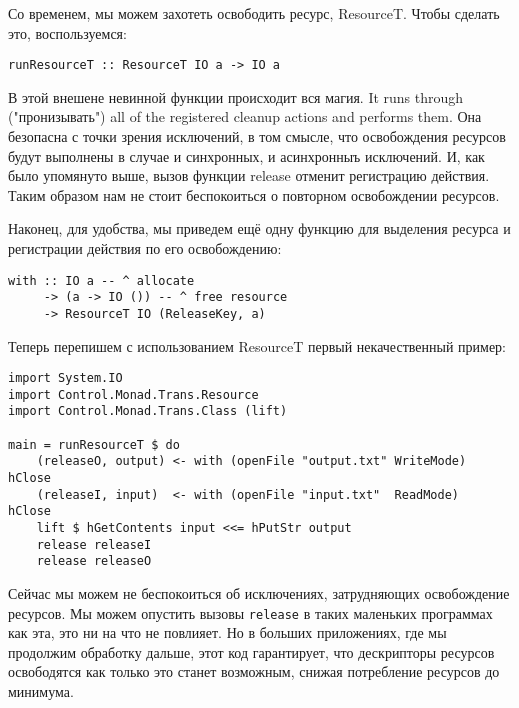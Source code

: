 Со временем, мы можем захотеть освободить ресурс, ResourceT. Чтобы сделать это,
воспользуемся:
\begin{verbatim}
runResourceT :: ResourceT IO a -> IO a
\end{verbatim}
В этой внешене невинной функции происходит вся магия. 
 It runs through ("пронизывать") all of
the
registered cleanup actions and performs them. Она безопасна с точки зрения исключений, в
том смысле, что освобождения ресурсов будут выполнены в случае и синхронных, и
асинхронныъ исключений. И, как было упомянуто выше, вызов функции release отменит
регистрацию действия. Таким образом нам не стоит беспокоиться о повторном освобождении
ресурсов.

Наконец, для удобства, мы приведем ещё одну функцию для выделения ресурса и регистрации
действия по его освобождению:
\begin{verbatim}
with :: IO a -- ^ allocate
     -> (a -> IO ()) -- ^ free resource
     -> ResourceT IO (ReleaseKey, a)
\end{verbatim}

Теперь перепишем с использованием ResourceT первый некачественный пример:
\begin{verbatim}
import System.IO
import Control.Monad.Trans.Resource
import Control.Monad.Trans.Class (lift)

main = runResourceT $ do
    (releaseO, output) <- with (openFile "output.txt" WriteMode) hClose
    (releaseI, input)  <- with (openFile "input.txt"  ReadMode)  hClose
    lift $ hGetContents input <<= hPutStr output
    release releaseI
    release releaseO
\end{verbatim}

Сейчас мы можем не беспокоиться об исключениях, затрудняющих освобождение ресурсов. Мы
можем опустить вызовы \verb=release= в таких маленьких программах как эта, это ни на что
не повлияет. Но в больших приложениях, где мы продолжим обработку дальше, этот код
гарантирует, что дескрипторы ресурсов освободятся как только это станет возможным, снижая
потребление ресурсов до минимума.
